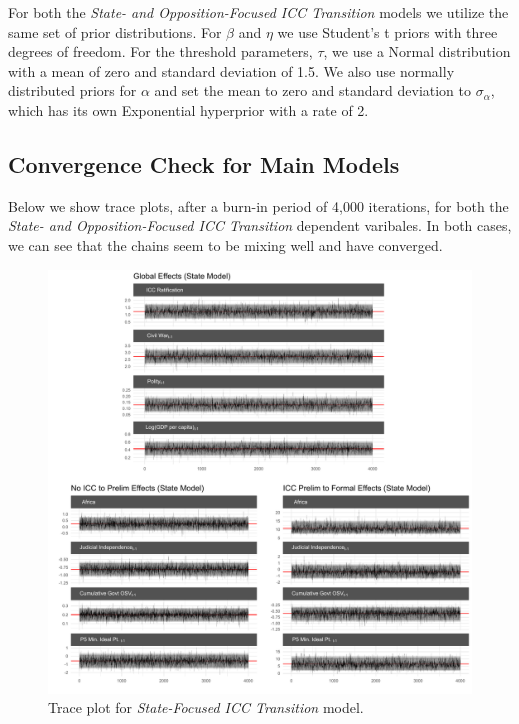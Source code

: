 For both the \emph{State- and Opposition-Focused ICC Transition} models we utilize the same set of prior distributions. For $\beta$ and $\eta$ we use Student's t priors with three degrees of freedom. For the threshold parameters, $\tau$, we use a Normal distribution with a mean of zero and standard deviation of 1.5. We also use normally distributed priors for $\alpha$ and set the mean to zero and standard deviation to $\sigma_{\alpha}$, which  has its own Exponential hyperprior with a rate of 2.

\subsection*{Convergence Check for Main Models}

Below we show trace plots, after a burn-in period of 4,000 iterations, for both the \emph{State- and Opposition-Focused ICC Transition} dependent varibales. In both cases, we can see that the chains seem to be mixing well and have converged.

\begin{figure}
    \centering
    \includegraphics[width=1\textwidth]{stateCoefTrace.pdf}
    \caption{Trace plot for \emph{State-Focused ICC Transition} model.}
    \label{fig:stateTrace}
\end{figure}
\FloatBarrier

